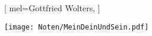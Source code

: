 [
    mel={Gottfried Wolters},
    ]

\texttt{[image: Noten/MeinDeinUndSein.pdf]}

\endsong

\beginscripture{}~\\
\endscripture